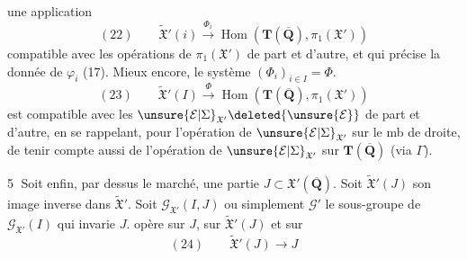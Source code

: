 une application
\[
(22)\qquad\widetilde{\mathfrak X}'(i)\xrightarrow{\Phi_i}\operatorname{Hom}(\mathbf T(\overline{\mathbf Q}),\pi_1(\mathfrak X'))
\]
compatible avec les opérations de $\pi_1(\mathfrak X')$
de part et d'autre, et qui précise
la donnée de $\varphi_i$ (17). Mieux encore,
le système $(\Phi_i)_{i\in I}=\Phi$.
\[
(23)\qquad\widetilde{\mathfrak X}'(I)\xrightarrow{\Phi}\operatorname{Hom}(\mathbf T(\overline{\mathbf Q}),\pi_1(\mathfrak X'))
\]
est compatible avec les $\unsure{\mathcal E|\Sigma}_{\mathfrak X'}\deleted{\unsure{\mathcal E}}$ de part et
d'autre, en se rappelant, pour l'opération
de $\unsure{\mathcal E|\Sigma}_{\mathfrak X'}$ sur le mb de droite, de tenir
compte aussi de l'opération de $\unsure{\mathcal E|\Sigma}_{\mathfrak X'}$
sur $\mathbf T(\overline{\mathbf Q})$ (via $\Gamma$).

\textcircled{5} Soit enfin, par dessus le marché, une
partie $J\subset\mathfrak X'(\overline{\mathbf Q})$. Soit $\widetilde{\mathfrak X}'(J)$ son
image inverse dans $\widetilde{\mathfrak X}'$. Soit $\mathcal G_{\mathfrak X'}(I,J)$
ou simplement $\mathcal G'$ le sous-groupe de $\mathcal G_{\mathfrak X'}(I)$
qui invarie $J$.  
opère sur $J$, sur $\widetilde{\mathfrak X}'(J)$ et sur
\[
(24)\qquad\widetilde{\mathfrak X}'(J)\longrightarrow J
\]

